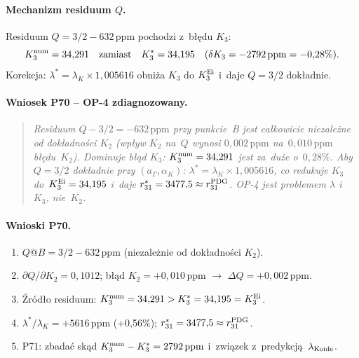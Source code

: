 \paragraph{Mechanizm residuum $Q$.}
Residuum $Q = 3/2 - 632\,\mathrm{ppm}$ pochodzi z~b\l{}\k{e}du $K_3$:
\[
  K_3^{\rm num} = 34{,}291 \quad \text{zamiast} \quad K_3^* = 34{,}195 \quad
  (\delta K_3 = -2792\,\mathrm{ppm} = -0{,}28\%).
\]
Korekcja: $\lambda^* = \lambda_K \times 1{,}005616$ obni\.za $K_3$ do $K_3^{\rm Ei}$ i~daje $Q = 3/2$ dok\l{}adnie.

\paragraph{Wniosek P70 -- OP-4 zdiagnozowany.}
\begin{quote}
\emph{Residuum $Q-3/2 = -632\,\mathrm{ppm}$ przy punkcie~B jest ca\l{}kowicie niezale\.zne
od dok\l{}adno\'sci $K_2$ (wp\l{}yw $K_2$ na~$Q$ wynosi $0{,}002\,\mathrm{ppm}$ na~$0{,}010\,\mathrm{ppm}$
b\l{}\k{e}du~$K_2$). Dominuje b\l{}\k{a}d $K_3$: $K_3^{\rm num}=34{,}291$ jest za~du\.ze o~$0{,}28\%$.
Aby $Q=3/2$ dok\l{}adnie przy $(a_\Gamma,\alpha_K)$: $\lambda^* = \lambda_K\times1{,}005616$,
co redukuje $K_3$ do~$K_3^{\rm Ei}=34{,}195$ i~daje $r_{31}^*=3477{,}5\approx r_{31}^{\rm PDG}$.
OP-4 jest problemem $\lambda$ i~$K_3$, nie~$K_2$.}
\end{quote}

\paragraph{Wnioski P70.}
\begin{enumerate}
  \item $Q@B = 3/2 - 632\,\mathrm{ppm}$ (niezale\.znie od dok\l{}adno\'sci $K_2$).
  \item $\partial Q/\partial K_2 = 0{,}1012$; b\l{}\k{a}d $K_2 = +0{,}010\,\mathrm{ppm}$ $\to$ $\Delta Q = +0{,}002\,\mathrm{ppm}$.
  \item \'Zr\'od\l{}o residuum: $K_3^{\rm num}=34{,}291 > K_3^*=34{,}195 = K_3^{\rm Ei}$.
  \item $\lambda^*/\lambda_K = +5616\,\mathrm{ppm}$ (+0{,}56\%); $r_{31}^*=3477{,}5 \approx r_{31}^{\rm PDG}$.
  \item P71: zbada\'c sk\k{a}d $K_3^{\rm num}-K_3^*=2792\,\mathrm{ppm}$ i~zwi\k{a}zek z~predykcj\k{a}~$\lambda_{\rm Koide}$.
\end{enumerate}


